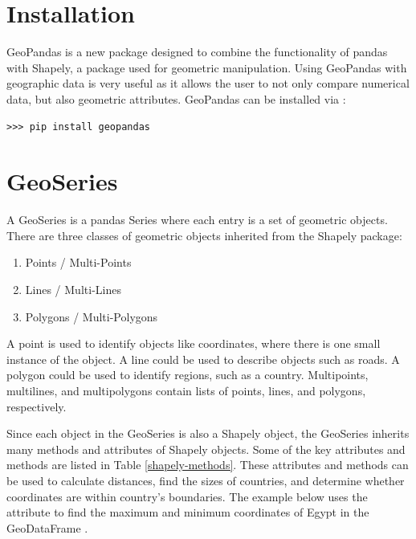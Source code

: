 


\section*{Installation} %
GeoPandas is a new package designed to combine the functionality of pandas with Shapely, a package used for geometric manipulation.
Using GeoPandas with geographic data is very useful as it allows the user to not only compare numerical data, but also geometric attributes.
GeoPandas can be installed via :
\begin{lstlisting}
>>> pip install geopandas
\end{lstlisting}

\section*{GeoSeries} %

A GeoSeries is a pandas Series where each entry is a set of geometric objects.
There are three classes of geometric objects inherited from the Shapely package:
\begin{enumerate}
\item Points / Multi-Points
\item Lines / Multi-Lines
\item Polygons / Multi-Polygons
\end{enumerate}
A point is used to identify objects like coordinates, where there is one small instance of the object.
A line could be used to describe objects such as roads.
A polygon could be used to identify regions, such as a country.
Multipoints, multilines, and multipolygons contain lists of points, lines, and polygons, respectively.

Since each object in the GeoSeries is also a Shapely object, the GeoSeries inherits many methods and attributes of Shapely objects.
Some of the key attributes and methods are listed in Table \ref{shapely-methods}.
These attributes and methods can be used to calculate distances, find the sizes of countries, and determine whether coordinates are within country's boundaries.
The example below uses the attribute  to find the maximum and minimum coordinates of Egypt in the GeoDataFrame .

